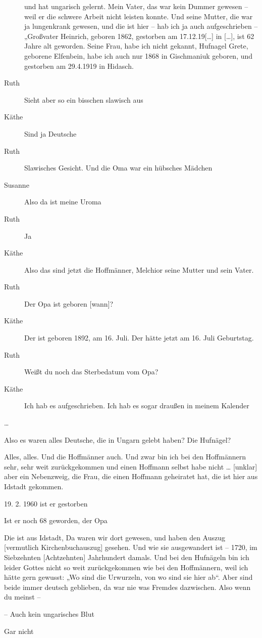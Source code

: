 \documentclass[ngerman,]{article}
\providecommand{\tightlist}{%
  \setlength{\itemsep}{0pt}\setlength{\parskip}{0pt}}
\begin{document}
\begin{multicols}{3}
\begin{description}
und hat ungarisch gelernt. Mein Vater, das war kein Dummer gewesen –
weil er die schwere Arbeit nicht leisten konnte. Und seine Mutter, die
war ja lungenkrank gewesen, und die ist hier – hab ich ja auch
aufgeschrieben – „Großvater Heinrich, geboren 1862, gestorben am
17.12.19{[}\ldots{}{]} in {[}\ldots{}{]}, ist 62 Jahre alt geworden.
Seine Frau, habe ich nicht gekannt, Hufnagel Grete, geborene Elfenbein,
habe ich auch nur 1868 in Gischmaniuk geboren, und gestorben am
29.4.1919 in Hidasch.
\item[Ruth]
Sieht aber so ein bisschen slawisch aus
\item[Käthe]
Sind ja Deutsche
\item[Ruth]
Slawisches Gesicht. Und die Oma war ein hübsches Mädchen
\item[Susanne]
Also da ist meine Uroma
\item[Ruth]
Ja
\item[Käthe]
Also das sind jetzt die Hoffmänner, Melchior seine Mutter und sein
Vater.
\item[Ruth]
Der Opa ist geboren {[}wann{]}?
\item[Käthe]
Der ist geboren 1892, am 16. Juli. Der hätte jetzt am 16. Juli
Geburtstag.
\item[Ruth]
Weißt du noch das Sterbedatum vom Opa?
\item[Käthe]
Ich hab es aufgeschrieben. Ich hab es sogar draußen in meinem Kalender
\end{description}

\ldots{}

\begin{description}
\tightlist
\item[Susanne]
Also es waren alles Deutsche, die in Ungarn gelebt haben? Die Hufnägel?
\item[Käthe]
Alles, alles. Und die Hoffmänner auch. Und zwar bin ich bei den
Hoffmännern sehr, sehr weit zurückgekommen und einen Hoffmann selbst
habe nicht \ldots{} {[}unklar{]} aber ein Nebenzweig, die Frau, die
einen Hoffmann geheiratet hat, die ist hier aus Idstadt gekommen.
\item[Friedrich]
19. 2. 1960 ist er gestorben
\item[Ruth]
Ist er noch 68 geworden, der Opa
\item[Käthe]
Die ist aus Idstadt, Da waren wir dort gewesen, und haben den Auszug
{[}vermutlich Kirchenbuchauszug{]} gesehen. Und wie sie ausgewandert ist
– 1720, im Siebzehnten {[}Achtzehnten{]} Jahrhundert damals. Und bei den
Hufnägeln bin ich leider Gottes nicht so weit zurückgekommen wie bei den
Hoffmännern, weil ich hätte gern gewusst: „Wo sind die Urwurzeln, von wo
sind sie hier ab“. Aber sind beide immer deutsch geblieben, da war nie
was Fremdes dazwischen. Also wenn du meinst –
\item[Ruth]
– Auch kein ungarisches Blut
\item[Käthe]
Gar nicht
\end{description}


\end{multicols}
\end{document}
